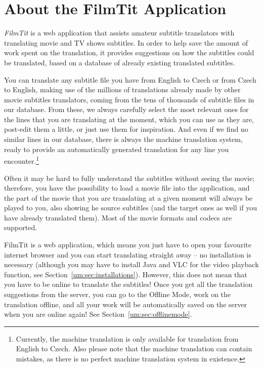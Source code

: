 \label{chap:users_manual}

\section{About the FilmTit Application}

\emph{FilmTit} is a web application that assists amateur subtitle translators with translating movie and TV shows subtitles. In order to help save the amount of work spent on the translation, it provides suggestions on how the subtitles could be translated, based on a database of already existing translated subtitles.

You can translate any subtitle file you have from English to Czech or from Czech to English, making use of the millions of translations already made by other movie subtitles translators, coming from the tens of thousands of subtitle files in our database. From these, we always carefully select the most relevant ones for the lines that you are translating at the moment, which you can use as they are, post-edit them a little, or just use them for inspiration. And even if we find no similar lines in our database, there is always the machine translation system, ready to provide an automatically generated translation for any line you encounter.\footnote{Currently, the machine translation is only available for translation from English to Czech. Also please note that the machine translation can contain mistakes, as there is no perfect machine translation system in existence.}

Often it may be hard to fully understand the subtitles without seeing the movie; therefore, you have the possibility to load a movie file into the application, and the part of the movie that you are translating at a given moment will  always be played to you, also showing he source subtitles (and the target ones as well if you have already translated them). Most of the movie formats and codecs are supported.

FilmTit is a web application, which means you just have to open your favourite internet browser and you can start translating straight away -- no installation is necessary (although you may have to install Java and VLC for the video playback function, see Section~\ref{um:sec:installations}). However, this does not mean that you have to be online to translate the subtitles! Once you get all the translation suggestions from the server, you can go to the Offline Mode, work on the translation offline, and all your work will be automatically saved on the server when you are online again! See Section~\ref{um:sec:offlinemode}.

